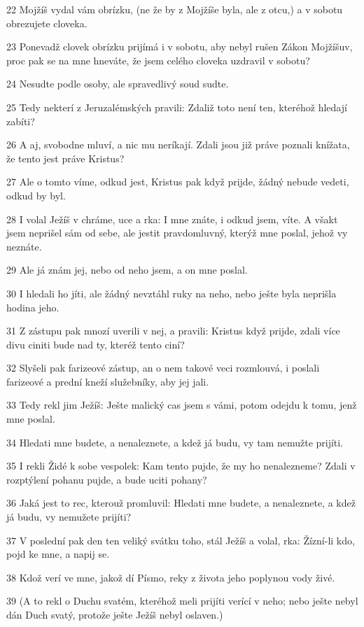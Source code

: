\par 22 Mojžíš vydal vám obrízku, (ne že by z Mojžíše byla, ale z otcu,) a v sobotu obrezujete cloveka.
\par 23 Ponevadž clovek obrízku prijímá i v sobotu, aby nebyl rušen Zákon Mojžíšuv, proc pak  se na mne hneváte, že jsem celého cloveka uzdravil v sobotu?
\par 24 Nesudte podle osoby, ale spravedlivý soud sudte.
\par 25 Tedy nekterí z Jeruzalémských pravili: Zdaliž toto není ten, kteréhož hledají zabíti?
\par 26 A aj, svobodne mluví, a nic mu neríkají. Zdali jsou již práve poznali knížata, že tento jest práve Kristus?
\par 27 Ale o tomto víme, odkud jest, Kristus pak když prijde, žádný nebude vedeti, odkud by byl.
\par 28 I volal Ježíš v chráme, uce a rka: I mne znáte, i odkud jsem, víte. A všakt jsem neprišel sám od sebe, ale jestit pravdomluvný, kterýž mne poslal, jehož vy neznáte.
\par 29 Ale já znám jej, nebo od neho jsem, a on mne poslal.
\par 30 I hledali ho jíti, ale žádný nevztáhl ruky na neho, nebo ješte byla neprišla hodina jeho.
\par 31 Z zástupu pak mnozí uverili v nej, a pravili: Kristus když prijde, zdali více divu ciniti bude nad ty, kteréž tento ciní?
\par 32 Slyšeli pak farizeové zástup, an o nem takové veci rozmlouvá, i poslali farizeové a prední kneží služebníky, aby jej jali.
\par 33 Tedy rekl jim Ježíš: Ješte malický cas jsem s vámi, potom odejdu k tomu, jenž mne poslal.
\par 34 Hledati mne budete, a nenaleznete, a kdež já budu, vy tam nemužte prijíti.
\par 35 I rekli Židé k sobe vespolek: Kam tento pujde, že my ho nenalezneme? Zdali v rozptýlení pohanu pujde, a bude uciti pohany?
\par 36 Jaká jest to rec, kterouž promluvil: Hledati mne budete, a nenaleznete, a kdež já budu, vy nemužete prijíti?
\par 37 V poslední pak den ten veliký svátku toho, stál Ježíš a volal, rka: Žízní-li kdo, pojd ke mne, a napij se.
\par 38 Kdož verí ve mne, jakož dí Písmo, reky z života jeho poplynou vody živé.
\par 39 (A to rekl o Duchu svatém, kteréhož meli prijíti verící v neho; nebo ješte nebyl dán Duch svatý, protože ješte Ježíš nebyl oslaven.)
